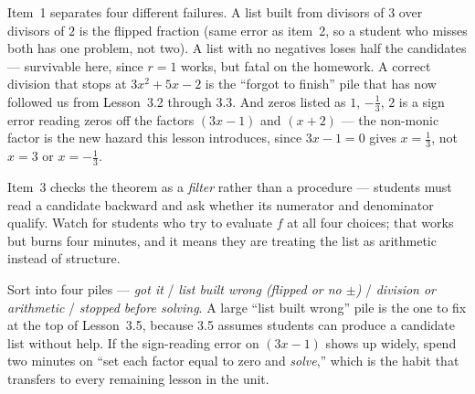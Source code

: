 \documentclass[10pt]{article}
\begin{document}
\begin{teachernote}
Item~1 separates four different failures. A list built from divisors of $3$ over divisors of $2$ is
the flipped fraction (same error as item~2, so a student who misses both has one problem, not two).
A list with no negatives loses half the candidates --- survivable here, since $r=1$ works, but fatal
on the homework. A correct division that stops at $3x^2+5x-2$ is the ``forgot to finish'' pile that
has now followed us from Lesson~3.2 through 3.3. And zeros listed as $1$, $-\frac13$, $2$ is a sign
error reading zeros off the factors $(3x-1)$ and $(x+2)$ --- the non-monic factor is the new hazard
this lesson introduces, since $3x-1=0$ gives $x=\frac13$, not $x=3$ or $x=-\frac13$.

\vspace{3pt}
Item~3 checks the theorem as a \emph{filter} rather than a procedure --- students must read a
candidate backward and ask whether its numerator and denominator qualify. Watch for students who try
to evaluate $f$ at all four choices; that works but burns four minutes, and it means they are
treating the list as arithmetic instead of structure.

\vspace{3pt}
Sort into four piles --- \emph{got it} / \emph{list built wrong (flipped or no $\pm$)} /
\emph{division or arithmetic} / \emph{stopped before solving}. A large ``list built wrong'' pile is
the one to fix at the top of Lesson~3.5, because 3.5 assumes students can produce a candidate list
without help. If the sign-reading error on $(3x-1)$ shows up widely, spend two minutes on ``set each
factor equal to zero and \emph{solve},'' which is the habit that transfers to every remaining lesson
in the unit.
\end{teachernote}
\end{document}
